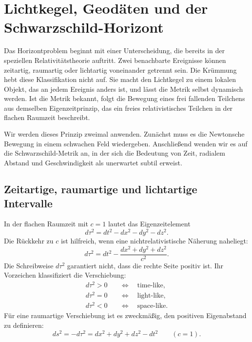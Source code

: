 \chapter{Lichtkegel, Geodäten und der Schwarzschild-Horizont}

Das Horizontproblem beginnt mit einer Unterscheidung, die bereits in der speziellen Relativitätstheorie auftritt. Zwei benachbarte Ereignisse können zeitartig, raumartig oder lichtartig voneinander getrennt sein. Die Krümmung hebt diese Klassifikation nicht auf. Sie macht den Lichtkegel zu einem lokalen Objekt, das an jedem Ereignis anders ist, und lässt die Metrik selbst dynamisch werden. Ist die Metrik bekannt, folgt die Bewegung eines frei fallenden Teilchens aus demselben Eigenzeitprinzip, das ein freies relativistisches Teilchen in der flachen Raumzeit beschreibt.

Wir werden dieses Prinzip zweimal anwenden. Zunächst muss es die Newtonsche Bewegung in einem schwachen Feld wiedergeben. Anschließend wenden wir es auf die Schwarzschild-Metrik an, in der sich die Bedeutung von Zeit, radialem Abstand und Geschwindigkeit als unerwartet subtil erweist.

\section{Zeitartige, raumartige und lichtartige Intervalle}

In der flachen Raumzeit mit \(c=1\) lautet das Eigenzeitelement
\begin{equation}
d\tau^2=dt^2-dx^2-dy^2-dz^2.
\label{eq:l5-minkowski-proper-time}
\end{equation}
Die Rückkehr zu \(c\) ist hilfreich, wenn eine nichtrelativistische Näherung naheliegt:
\begin{equation}
d\tau^2
=dt^2-\frac{dx^2+dy^2+dz^2}{c^2}.
\label{eq:l5-minkowski-c}
\end{equation}
Die Schreibweise \(d\tau^2\) garantiert nicht, dass die rechte Seite positiv ist. Ihr Vorzeichen klassifiziert die Verschiebung:
\begin{align}
d\tau^2>0
&\quad\Longleftrightarrow\quad \text{time-like},\\
d\tau^2=0
&\quad\Longleftrightarrow\quad \text{light-like},\\
d\tau^2<0
&\quad\Longleftrightarrow\quad \text{space-like}.
\end{align}
Für eine raumartige Verschiebung ist es zweckmäßig, den positiven Eigenabstand zu definieren:
\begin{equation}
ds^2=-d\tau^2
=dx^2+dy^2+dz^2-dt^2
\qquad(c=1).
\label{eq:l5-proper-distance}
\end{equation}


